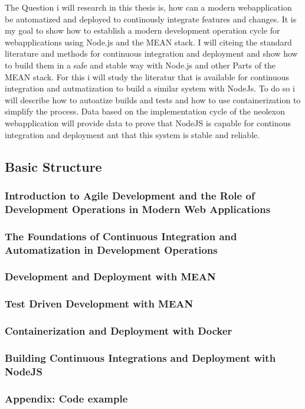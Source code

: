 The Question i will research in this thesis is, how can a modern webapplication be automatized and deployed to continously integrate features and
changes. It is my goal to show how to establish a modern development operation cycle for webapplications using Node.js and the MEAN stack.
I will citeing the standard literature and methods for continuous integration and deployment and show how to build them in a safe and stable
way with Node.js and other Parts of the MEAN stack.
For this i will study the literatur that is available for continuous integration and autmatization to build a similar system with NodeJs.
To do so i will describe how to autoatize builds and tests and how to use containerization to simplify the process. Data based on the
implementation cycle of the neolexon webapplication will provide data to prove that NodeJS is capable for continous integration and deployment
ant that this system is stable and reliable.

\subsection{Basic Structure}
\subsubsection{Introduction to Agile Development and the Role of Development Operations in Modern Web Applications}
\subsubsection{The Foundations of Continuous Integration and Automatization in Development Operations}
\subsubsection{Development and Deployment with MEAN}
\subsubsection{Test Driven Development with MEAN}
\subsubsection{Containerization and Deployment with Docker}
\subsubsection{Building Continuous Integrations and Deployment with NodeJS}
\subsubsection{Appendix: Code example}


